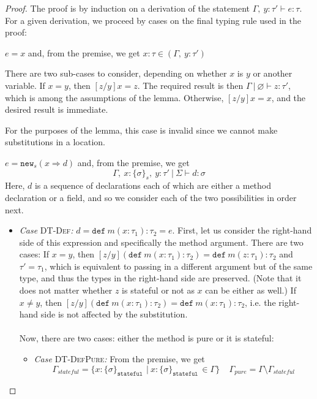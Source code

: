 \documentclass{llncs}
\newcommand{\keywadj}[1]{\mathtt{#1}}
\newcommand{\keyw}[1]{\keywadj{#1}~}
\newcommand{\pcase}[1][]{
  \if\relax\detokenize{#1}\relax
    \def\thiscase{}
  \else
    \def\thiscase{~#1}
  \fi
  \item
}
\begin{document}
\begin{proof} The proof is by induction on a derivation of the statement $\Gamma,~y : \tau' \vdash e : \tau$. For a given derivation, we proceed by cases on the final typing rule used in the proof:

\begin{pcases}
\pcase[\textsc{T-Var}]
$e = x$ and, from the premise, we get $x : \tau \in (\Gamma,~y : \tau')$

There are two sub-cases to consider, depending on whether $x$ is $y$ or another variable. If $x = y$, then $[z/y]x = z$. The required result is then $\Gamma~|~\varnothing \vdash z : \tau'$, which is among the assumptions of the lemma. Otherwise, $[z/y]x = x$, and the desired result is immediate.
\\
\pcase[\textsc{T-Loc}] For the purposes of the lemma, this case is invalid since we cannot make substitutions in a location.
\\
\pcase[\textsc{T-New}]
$e = \keywadj{new}_{s}(x \Rightarrow d)$ and, from the premise, we get
\[
\Gamma,~x : \{ \sigma \}_{s},~y : \tau'~|~\Sigma \vdash d : \sigma
\]
Here, $d$ is a sequence of declarations each of which are either a method declaration or a field, and so we consider each of the two possibilities in order next.
\\
\begin{itemize}
\item[] \textit{Case} \textsc{DT-Def}\textit{:} $d = \keyw{def} m(x : \tau_1) : \tau_2 = e$. First, let us consider the right-hand side of this expression and specifically the method argument. There are two cases: If $x = y$, then $[z/y](\keyw{def} m(x : \tau_1) : \tau_2) = \keyw{def} m(z : \tau_1) : \tau_2$ and $\tau' = \tau_1$, which is equivalent to passing in a different argument but of the same type, and thus the types in the right-hand side are preserved. (Note that it does not matter whether $z$ is stateful or not as $x$ can be either as well.) If $ x \neq y$, then $[z/y](\keyw{def} m(x : \tau_1) : \tau_2) = \keyw{def} m(x : \tau_1) : \tau_2$, i.e. the right-hand side is not affected by the substitution.
\\\\
Now, there are two cases: either the method is pure or it is stateful:
\\
\begin{itemize}
\item[] \textit{Case} \textsc{DT-DefPure}\textit{:} From the premise, we get
\[
\Gamma_{stateful} = \{x : \{ \sigma \}_{\keyw{stateful}} ~|~ x : \{ \sigma \}_{\keyw{stateful}} \in \Gamma\}~~~~~\Gamma_{pure} = \Gamma \setminus \Gamma_{stateful}
\]
\end{itemize}
\end{itemize}
\end{pcases}
\end{proof}
\end{document}
